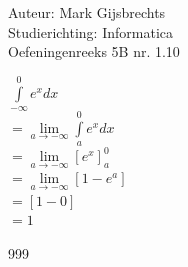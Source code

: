 \documentclass[a4paper]{article}
\newcommand{\dint}{\displaystyle\int}
\begin{document}
\noindent \large Auteur: Mark Gijsbrechts \\
\noindent \large Studierichting: Informatica\\
\noindent \large Oefeningenreeks 5B nr. 1.10\\

\medskip

\normalsize





$ \dint\limits_{-\infty}^{0} e^x dx $ \\

$= \lim\limits_{a \to -\infty} \dint\limits_{a}^{0} e^x dx $ \\

$= \lim\limits_{a \to -\infty} \left[ e^x \right]_{a}^{0}  $ \\

$= \lim\limits_{a \to -\infty}  \left[ 1 - e^a \right]  $ \\

$= \left[ 1 - 0 \right]  $ \\

$= 1 $ \\





\begin{thebibliography}{999}
\end{thebibliography}
\end{document}
